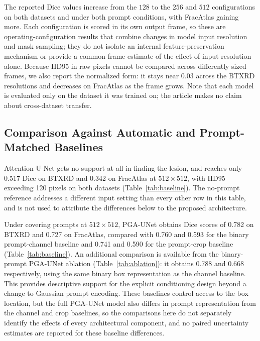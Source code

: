 The reported Dice values increase from the $128$ to the $256$ and $512$ configurations on both datasets and under both prompt conditions, with FracAtlas gaining more. Each configuration is scored in its own output frame, so these are operating-configuration results that combine changes in model input resolution and mask sampling; they do not isolate an internal feature-preservation mechanism or provide a common-frame estimate of the effect of input resolution alone. Because HD95 in raw pixels cannot be compared across differently sized frames, we also report the normalized form: it stays near $0.03$ across the BTXRD resolutions and decreases on FracAtlas as the frame grows. Note that each model is evaluated only on the dataset it was trained on; the article makes no claim about cross-dataset transfer.

\subsection{Comparison Against Automatic and Prompt-Matched Baselines}
\label{sec:baseline}
Attention U-Net gets no support at all in finding the lesion, and reaches only 0.517 Dice on BTXRD and 0.342 on FracAtlas at $512\times512$, with HD95 exceeding 120 pixels on both datasets (Table~\ref{tab:baseline}). The no-prompt reference addresses a different input setting than every other row in this table, and is not used to attribute the differences below to the proposed architecture.

Under covering prompts at $512\times512$, PGA-UNet obtains Dice scores of 0.782 on BTXRD and 0.727 on FracAtlas, compared with 0.760 and 0.593 for the binary prompt-channel baseline and 0.741 and 0.590 for the prompt-crop baseline (Table~\ref{tab:baseline}). An additional comparison is available from the binary-prompt PGA-UNet ablation (Table~\ref{tab:ablation}): it obtains 0.788 and 0.668 respectively, using the same binary box representation as the channel baseline. This provides descriptive support for the explicit conditioning design beyond a change to Gaussian prompt encoding. These baselines control access to the box location, but the full PGA-UNet model also differs in prompt representation from the channel and crop baselines, so the comparisons here do not separately identify the effects of every architectural component, and no paired uncertainty estimates are reported for these baseline differences.

